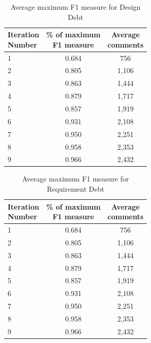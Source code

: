 \begin{table}[!thb]
    \begin{center}
        \caption{Average maximum F1 measure for Design Debt}
        \label{tbl:design_iteration_performance}
        \begin{tabular}{l| c c }
        \toprule
        \thead{Iteration\\Number} & \thead{\% of maximum\\F1 measure} & \thead{Average\\comments} \\
        \midrule
         1  &  0.684  & 756   \\  
         2  &  0.805  & 1,106 \\  
         3  &  0.863  & 1,444 \\  
         4  &  0.879  & 1,717 \\  
         5  &  0.857  & 1,919 \\  
         6  &  0.931  & 2,108 \\  
         7  &  0.950  & 2,251 \\  
         8  &  0.958  & 2,353 \\  
         9  &  0.966  & 2,432 \\  
        \bottomrule
        \end{tabular}
    \end{center}    
\end{table}

\begin{table}[!thb]
	\begin{center}
		\caption{Average maximum F1 measure for Requirement Debt}
		\label{tbl:requirement_iteration_performance}
		\begin{tabular}{l| c c }
			\toprule
			\thead{Iteration\\Number} & \thead{\% of maximum\\F1 measure} & \thead{Average\\comments} \\
			\midrule
			1  &  0.684  & 756 \\  
			2  &  0.805  & 1,106 \\  
			3  &  0.863  & 1,444 \\  
			4  &  0.879  & 1,717 \\  
			5  &  0.857  & 1,919 \\  
			6  &  0.931  & 2,108 \\  
			7  &  0.950  & 2,251 \\  
			8  &  0.958  & 2,353 \\  
			9  &  0.966  & 2,432 \\  
			\bottomrule
		\end{tabular}
	\end{center}    
\end{table}

